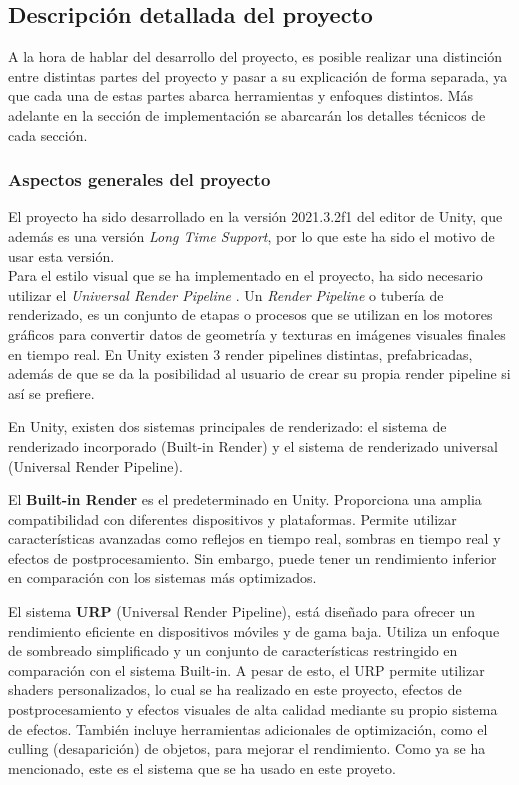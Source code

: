 \subsection{Descripción detallada del proyecto }

A la hora de hablar del desarrollo del proyecto, es posible realizar una distinción entre
 distintas partes del proyecto y pasar a su explicación de forma separada, ya que cada una de estas 
 partes abarca herramientas y enfoques distintos. Más adelante en la sección de implementación se abarcarán los detalles técnicos de cada sección.

\subsubsection{Aspectos generales del proyecto}

El proyecto ha sido desarrollado en la versión 2021.3.2f1 \cite{UnityLTS} del editor de Unity, que además es una versión \textit{Long Time Support}, por lo que este ha sido el motivo de usar esta versión.\\

Para el estilo visual que se ha implementado en el proyecto, ha sido necesario utilizar el \textit{Universal Render Pipeline} \cite{URP}. Un \textit{Render Pipeline} \cite{RenderPipeline} o tubería de renderizado, es un conjunto de etapas o procesos que se utilizan en los motores gráficos para convertir datos de geometría y texturas en imágenes visuales finales en tiempo real. En Unity existen 3 render pipelines distintas, prefabricadas, además de que se da la posibilidad al usuario de crear su propia render pipeline si así se prefiere.

En Unity, existen dos sistemas principales de renderizado: el sistema de renderizado incorporado (Built-in Render) y el sistema de renderizado universal (Universal Render Pipeline).

El \textbf{Built-in Render} es el predeterminado en Unity. Proporciona una amplia compatibilidad con diferentes dispositivos y plataformas. Permite utilizar características avanzadas como reflejos en tiempo real, sombras en tiempo real y efectos de postprocesamiento. Sin embargo, puede tener un rendimiento inferior en comparación con los sistemas más optimizados.

El sistema \textbf{URP} (Universal Render Pipeline), está diseñado para ofrecer un rendimiento eficiente en dispositivos móviles y de gama baja. Utiliza un enfoque de sombreado simplificado y un conjunto de características restringido en comparación con el sistema Built-in. A pesar de esto, el URP permite utilizar shaders personalizados, lo cual se ha realizado en este proyecto, efectos de postprocesamiento y efectos visuales de alta calidad mediante su propio sistema de efectos. También incluye herramientas adicionales de optimización, como el culling (desaparición) de objetos, para mejorar el rendimiento. Como ya se ha mencionado, este es el sistema que se ha usado en este proyeto.

